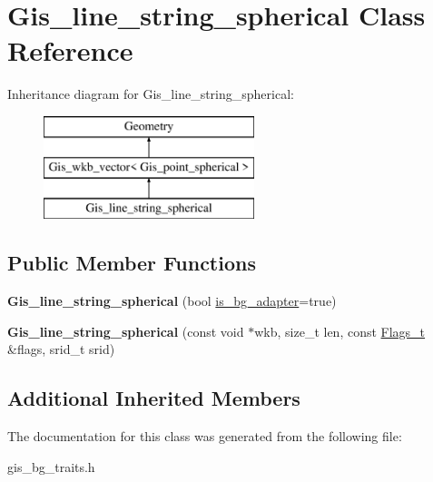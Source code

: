 \hypertarget{classGis__line__string__spherical}{}\section{Gis\+\_\+line\+\_\+string\+\_\+spherical Class Reference}
\label{classGis__line__string__spherical}
Inheritance diagram for Gis\+\_\+line\+\_\+string\+\_\+spherical\+:\begin{figure}[H]
\begin{center}
\leavevmode
\includegraphics[height=3.000000cm]{classGis__line__string__spherical}
\end{center}
\end{figure}
\subsection*{Public Member Functions}
\begin{DoxyCompactItemize}
\item 
\mbox{\label{classGis__line__string__spherical_a6682112733ec68d2156f78ec24d8c8b3}} 
{\bfseries Gis\+\_\+line\+\_\+string\+\_\+spherical} (bool \mbox{\hyperlink{classGeometry_ada614004627a9e7af129e51a34242af9}{is\+\_\+bg\+\_\+adapter}}=true)
\item 
\mbox{\label{classGis__line__string__spherical_a205db8241fff614e66c6a16d91d34038}} 
{\bfseries Gis\+\_\+line\+\_\+string\+\_\+spherical} (const void $\ast$wkb, size\+\_\+t len, const \mbox{\hyperlink{classGeometry_1_1Flags__t}{Flags\+\_\+t}} \&flags, srid\+\_\+t srid)
\end{DoxyCompactItemize}
\subsection*{Additional Inherited Members}


The documentation for this class was generated from the following file\+:\begin{DoxyCompactItemize}
\item 
gis\+\_\+bg\+\_\+traits.\+h\end{DoxyCompactItemize}
